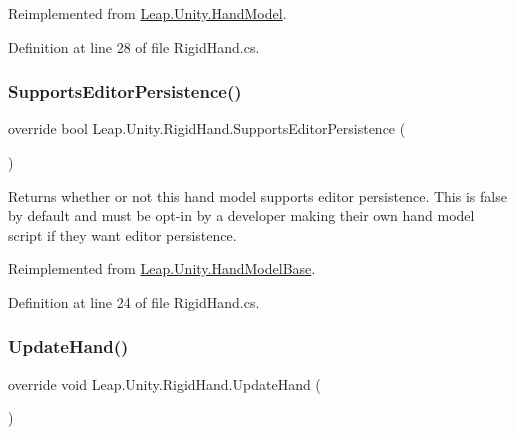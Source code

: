 Reimplemented from \mbox{\hyperlink{class_leap_1_1_unity_1_1_hand_model_a67f1a6887e0803c96095a376fc1e6031}{Leap.\+Unity.\+Hand\+Model}}.



Definition at line 28 of file Rigid\+Hand.\+cs.

\mbox{\label{class_leap_1_1_unity_1_1_rigid_hand_ae917a680f49c928d78c59a842798d7ae}} 
\subsubsection{\texorpdfstring{SupportsEditorPersistence()}{SupportsEditorPersistence()}}
{\footnotesize\ttfamily override bool Leap.\+Unity.\+Rigid\+Hand.\+Supports\+Editor\+Persistence (\begin{DoxyParamCaption}{ }\end{DoxyParamCaption})\hspace{0.3cm}{\ttfamily [virtual]}}



Returns whether or not this hand model supports editor persistence. This is false by default and must be opt-\/in by a developer making their own hand model script if they want editor persistence. 



Reimplemented from \mbox{\hyperlink{class_leap_1_1_unity_1_1_hand_model_base_acd4789523584dd7d240e1d426b4d321c}{Leap.\+Unity.\+Hand\+Model\+Base}}.



Definition at line 24 of file Rigid\+Hand.\+cs.

\mbox{\label{class_leap_1_1_unity_1_1_rigid_hand_a335a489bb61e5d3a95119ffdda8794b1}} 
\subsubsection{\texorpdfstring{UpdateHand()}{UpdateHand()}}
{\footnotesize\ttfamily override void Leap.\+Unity.\+Rigid\+Hand.\+Update\+Hand (\begin{DoxyParamCaption}{ }\end{DoxyParamCaption})\hspace{0.3cm}{\ttfamily [virtual]}}

